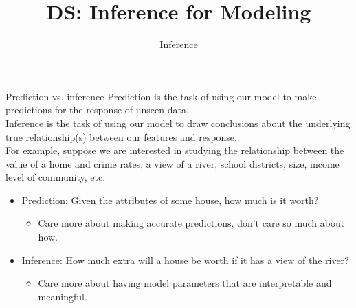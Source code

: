 \documentclass[aspectratio=169]{../latex_main/tntbeamer}  %
\title[Introduction]{DS: Inference for Modeling}
\subtitle{Inference}
\begin{document}
	
	\maketitle
	\begin{frame}{Prediction vs. inference}
	    Prediction is the task of using our model to make predictions for the response of unseen data.\\
	    \bigskip
	    Inference is the task of using our model to draw conclusions about the underlying true relationship(s) between our features and response.\\
	    \bigskip
	    For example, suppose we are interested in studying the relationship between the value of a home and crime rates, a view of a river, school districts, size, income level of community, etc.
	    \begin{itemize}
	        \item Prediction: Given the attributes of some house, how much is it worth?
	        \begin{itemize}
	            \item Care more about making accurate predictions, don’t care so much about how.
	        \end{itemize}
	        \item Inference: How much extra will a house be worth if it has a view of the river?
	        \begin{itemize}
	            \item Care more about having model parameters that are interpretable and meaningful.
	        \end{itemize}
	    \end{itemize}
	\end{frame}
	
\end{document}
